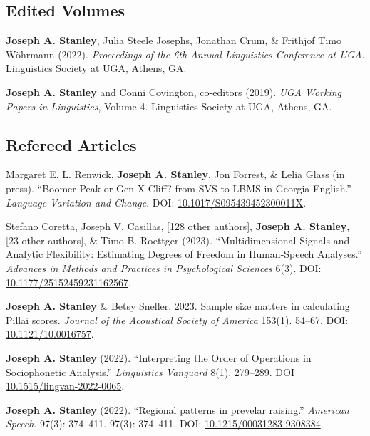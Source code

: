\documentclass[
]{article}
\begin{document}
\hypertarget{edited-volumes}{%
\subsection{Edited Volumes}\label{edited-volumes}}

\textbf{Joseph A. Stanley}, Julia Steele Josephs, Jonathan Crum, \&
Frithjof Timo Wöhrmann (2022). \emph{Proceedings of the 6th Annual
Linguistics Conference at UGA}. Linguistics Society at UGA, Athens, GA.

\textbf{Joseph A. Stanley} and Conni Covington, co-editors (2019).
\emph{UGA Working Papers in Linguistics}, Volume 4. Linguistics Society
at UGA, Athens, GA.

\hypertarget{refereed-articles}{%
\subsection{Refereed Articles}\label{refereed-articles}}

Margaret E. L. Renwick, \textbf{Joseph A. Stanley}, Jon Forrest, \&
Lelia Glass (in press). ``Boomer Peak or Gen X Cliff? from SVS to LBMS
in Georgia English.'' \emph{Language Variation and Change}. DOI:
\href{https://doi.org/10.1017/S095439452300011X}{10.1017/S095439452300011X}.

Stefano Coretta, Joseph V. Casillas, {[}128 other authors{]},
\textbf{Joseph A. Stanley}, {[}23 other authors{]}, \& Timo B. Roettger
(2023). ``Multidimensional Signals and Analytic Flexibility: Estimating
Degrees of Freedom in Human-Speech Analyses.'' \emph{Advances in Methods
and Practices in Psychological Sciences} 6(3). DOI:
\href{https://doi.org/10.1177/25152459231162567}{10.1177/25152459231162567}.

\textbf{Joseph A. Stanley} \& Betsy Sneller. 2023. Sample size matters
in calculating Pillai scores. \emph{Journal of the Acoustical Society of
America} 153(1). 54--67. DOI:
\href{https://asa.scitation.org/doi/pdf/10.1121/10.0016757}{10.1121/10.0016757}.

\textbf{Joseph A. Stanley} (2022). ``Interpreting the Order of
Operations in Sociophonetic Analysis.'' \emph{Linguistics Vanguard}
8(1). 279--289. DOI
\href{https://doi.org/10.1515/lingvan-2022-0065}{10.1515/lingvan-2022-0065}.

\textbf{Joseph A. Stanley} (2022). ``Regional patterns in prevelar
raising.'' \emph{American Speech}. 97(3): 374--411. 97(3): 374--411.
DOI:
\href{http://doi.org/10.1215/00031283-9308384}{10.1215/00031283-9308384}.
\end{document}
